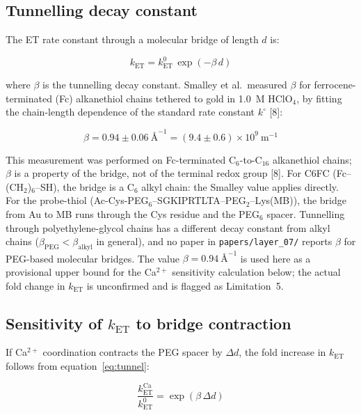 \documentclass[10pt,a4paper]{article}
\numberwithin{equation}{section}
\newcommand{\cit}[1]{[#1]}   %
\newcommand{\As}{\text{\AA}^{-1}}
\begin{document}
\subsection{Tunnelling decay constant}

The ET rate constant through a molecular bridge of length $d$ is:

\begin{equation}
  k_{\mathrm{ET}} = k_{\mathrm{ET}}^0\,\exp(-\beta\,d)
  \label{eq:tunnel}
\end{equation}

where $\beta$ is the tunnelling decay constant. Smalley et al.\ measured $\beta$ for
ferrocene-terminated (Fc) alkanethiol chains tethered to gold in 1.0~M HClO$_4$, by
fitting the chain-length dependence of the standard rate constant $k^\circ$ \cit{8}:

\begin{equation}
  \beta = 0.94 \pm 0.06\ \As
        = (9.4 \pm 0.6) \times 10^9\ \text{m}^{-1}
  \label{eq:beta}
\end{equation}

This measurement was performed on Fc-terminated C$_6$-to-C$_{16}$ alkanethiol chains;
$\beta$ is a property of the bridge, not of the terminal redox group \cit{8}.
For C6FC (Fc--(CH$_2$)$_6$--SH), the bridge is a C$_6$ alkyl chain: the Smalley value
applies directly. For the probe-thiol (Ac-Cys-PEG$_6$--SGKIPRTLTA--PEG$_2$--Lys(MB)),
the bridge from Au to MB runs through the Cys residue and the PEG$_6$ spacer.
Tunnelling through polyethylene-glycol chains has a different decay constant from alkyl
chains ($\beta_{\mathrm{PEG}} < \beta_{\mathrm{alkyl}}$ in general), and no paper in
\texttt{papers/layer\_07/} reports $\beta$ for PEG-based molecular bridges.
The value $\beta = 0.94\ \As$ is used here as a provisional upper bound for the
Ca$^{2+}$ sensitivity calculation below; the actual fold change in $k_{\mathrm{ET}}$
is unconfirmed and is flagged as Limitation~5.

\subsection{Sensitivity of $k_{\mathrm{ET}}$ to bridge contraction}

If Ca$^{2+}$ coordination contracts the PEG spacer by $\Delta d$, the fold increase in
$k_{\mathrm{ET}}$ follows from equation~\eqref{eq:tunnel}:

\begin{equation}
  \frac{k_{\mathrm{ET}}^{\mathrm{Ca}}}{k_{\mathrm{ET}}^0}
    = \exp(\beta\,\Delta d)
  \label{eq:kfold}
\end{equation}
\end{document}
